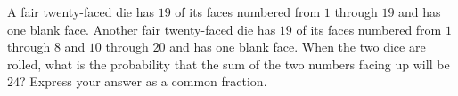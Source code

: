 A fair twenty-faced die has $19$ of its faces numbered from $1$ through $19$ and has one blank face. Another fair twenty-faced die has $19$ of its faces numbered from $1$ through $8$ and $10$ through $20$ and has one blank face. When the two dice are rolled, what is the probability that the sum of the two numbers facing up will be $24$? Express your answer as a common fraction.
